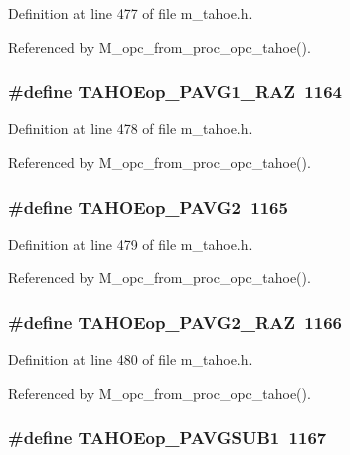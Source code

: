 Definition at line 477 of file m\_\-tahoe.h.

Referenced by M\_\-opc\_\-from\_\-proc\_\-opc\_\-tahoe().
\subsubsection{\setlength{\rightskip}{0pt plus 5cm}\#define TAHOEop\_\-PAVG1\_\-RAZ~1164}\label{m__tahoe_8h_900417454f72cf3355a630d7e3e921e0}




Definition at line 478 of file m\_\-tahoe.h.

Referenced by M\_\-opc\_\-from\_\-proc\_\-opc\_\-tahoe().
\subsubsection{\setlength{\rightskip}{0pt plus 5cm}\#define TAHOEop\_\-PAVG2~1165}\label{m__tahoe_8h_320bd38a000c7264308ec556929c4cff}




Definition at line 479 of file m\_\-tahoe.h.

Referenced by M\_\-opc\_\-from\_\-proc\_\-opc\_\-tahoe().
\subsubsection{\setlength{\rightskip}{0pt plus 5cm}\#define TAHOEop\_\-PAVG2\_\-RAZ~1166}\label{m__tahoe_8h_a2955e9faa2b50dbde9ac12bbd0f8c4e}




Definition at line 480 of file m\_\-tahoe.h.

Referenced by M\_\-opc\_\-from\_\-proc\_\-opc\_\-tahoe().
\subsubsection{\setlength{\rightskip}{0pt plus 5cm}\#define TAHOEop\_\-PAVGSUB1~1167}\label{m__tahoe_8h_5dcb7958a219bed9e450102e69eab36b}




